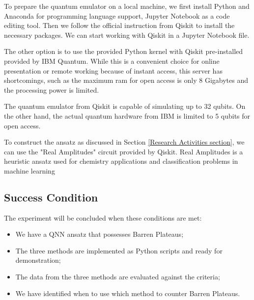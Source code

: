 To prepare the quantum emulator on a local machine, we first install Python and Anaconda for programming language support, Jupyter Notebook as a code editing tool.
Then we follow the official instruction from Qiskit \cite{Qiskit} to install the necessary packages.
We can start working with Qiskit in a Jupyter Notebook file.

The other option is to use the provided Python kernel with Qiskit pre-installed provided by IBM Quantum. 
While this is a convenient choice for online presentation or remote working because of instant access, this server has shortcomings, such as the maximum ram for open access is only 8 Gigabytes and the processing power is limited.

The quantum emulator from Qiskit is capable of simulating up to 32 qubits. On the other hand, the actual quantum hardware from IBM is limited to 5 qubits for open access.

To construct the ansatz as discussed in Section \ref{Research Activities section}, we can use the "Real Amplitudes" circuit provided by Qiskit. Real Amplitudes is a heuristic ansatz used for chemistry applications and classification problems in machine learning


\subsection{Success Condition}
The experiment will be concluded when these conditions are met:
\begin{itemize}
    \item We have a QNN ansatz that possesses Barren Plateaus;
    \item The three methods are implemented as Python scripts and ready for demonstration;
    \item The data from the three methods are evaluated against the criteria;
    \item We have identified when to use which method to counter Barren Plateaus.
\end{itemize}